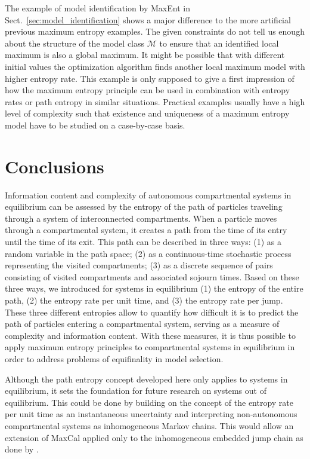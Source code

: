 \documentclass[smallextended]{svjour3}
\begin{document}
The example of model identification by MaxEnt in Sect.~\ref{sec:model_identification} shows a major difference to the more artificial previous maximum entropy examples.
The given constraints do not tell us enough about the structure of the model class $\mathcal{M}$ to ensure that an identified local maximum is also a global maximum.
It might be possible that with different initial values the optimization algorithm finds another local maximum model with higher entropy rate.
This example is only supposed to give a first impression of how the maximum entropy principle can be used in combination with entropy rates or path entropy in similar situations.
Practical examples usually have a high level of complexity such that existence and uniqueness of a maximum entropy model have to be studied on a case-by-case basis.


\section{Conclusions}
Information content and complexity of autonomous compartmental systems in equilibrium can be assessed by the entropy of the path of particles traveling through a system of interconnected compartments. When a particle moves through a compartmental system, it creates a path from the time of its entry until the time of its exit. This path can be described in three ways: (1) as a random variable in the path space; (2) as a continuous-time stochastic process representing the visited compartments; (3) as a discrete sequence of pairs consisting of visited compartments and associated sojourn times. 
Based on these three ways, we introduced for systems in equilibrium (1) the entropy of the entire path, (2) the entropy rate per unit time, and (3) the entropy rate per jump. These three different entropies allow to quantify how difficult it is to predict the path of particles entering a compartmental system, serving as a measure of complexity and information content. With these measures, it is thus possible to apply maximum entropy principles to compartmental systems in equilibrium in order to address problems of equifinality in model selection. 

Although the path entropy concept developed here only applies to systems in equilibrium, it sets the foundation for future research on systems out of equilibrium. 
This could be done by building on the concept of the entropy rate per unit time as an instantaneous uncertainty and interpreting non-autonomous compartmental systems as inhomogeneous Markov chains.
This would allow an extension of MaxCal applied only to the inhomogeneous embedded jump chain as done by \citet{Ge2012JCP}.
\end{document}
